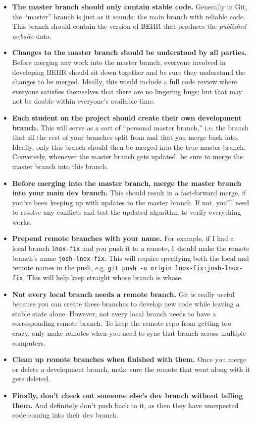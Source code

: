 \documentclass[12pt]{article}
\begin{document}
	\begin{itemize}
	\item \textbf{The master branch should only contain stable code.} Generally in Git, the ``master'' branch is just as it sounds: the main branch with reliable code. This branch should contain the version of BEHR that produces the \emph{published website} data.
	\item \textbf{Changes to the master branch should be understood by all parties.} Before merging any work into the master branch, everyone involved in developing BEHR should sit down together and be sure they understand the changes to be merged. Ideally, this would include a full code review where everyone satisfies themselves that there are no lingering bugs; but that may not be doable within everyone's available time.
	\item \textbf{Each student on the project should create their own development branch.}  This will serve as a sort of ``personal master branch,'' i.e. the branch that all the rest of your branches split from and that you merge back into. Ideally, only this branch should then be merged into the true master branch. Conversely, whenever the master branch gets updated, be sure to merge the master branch into this branch.
	\item \textbf{Before merging into the master branch, merge the master branch into your main dev branch.} This should result in a fast-forward merge, if you've been keeping up with updates to the master branch. If not, you'll need to resolve any conflicts and test the updated algorithm to verify everything works.
	\item \textbf{Prepend remote branches with your name.} For example, if I had a local branch \lstinline$lnox-fix$ and you push it to a remote, I should make the remote branch's name \lstinline$josh-lnox-fix$. This will require specifying both the local and remote names in the push, e.g. \lstinline$git push -u origin lnox-fix:josh-lnox-fix$. This will help keep straight whose branch is whose.
	\item \textbf{Not every local branch needs a remote branch.} Git is really useful because you can create these branches to develop new code while leaving a stable state alone. However, not every local branch needs to have a corresponding remote branch.  To keep the remote repo from getting too crazy, only make remotes when you need to sync that branch across multiple computers.
	\item \textbf{Clean up remote branches when finished with them.} Once you merge or delete a development branch, make sure the remote that went along with it gets deleted.
	\item \textbf{Finally, don't check out someone else's dev branch without telling them.} And definitely don't push back to it, as then they have unexpected code coming into their dev branch.
	\end{itemize}
	
\end{document}
